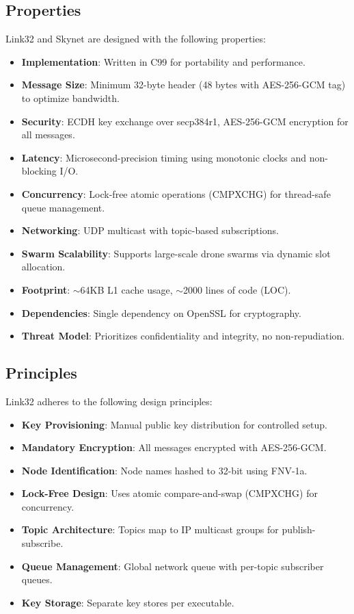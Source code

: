 \documentclass{article}
\begin{document}
\subsection{Properties}
Link32 and Skynet are designed with the following properties:
\begin{itemize}
    \item \textbf{Implementation}: Written in C99 for portability and performance.
    \item \textbf{Message Size}: Minimum 32-byte header (48 bytes with AES-256-GCM tag) to optimize
          bandwidth.
    \item \textbf{Security}: ECDH key exchange over secp384r1, AES-256-GCM encryption for all
          messages.
    \item \textbf{Latency}: Microsecond-precision timing using monotonic clocks and non-blocking I/O.
    \item \textbf{Concurrency}: Lock-free atomic operations (CMPXCHG) for thread-safe queue
          management.
    \item \textbf{Networking}: UDP multicast with topic-based subscriptions.
    \item \textbf{Swarm Scalability}: Supports large-scale drone swarms via dynamic slot allocation.
    \item \textbf{Footprint}: $\sim$64KB L1 cache usage, $\sim$2000 lines of code (LOC).
    \item \textbf{Dependencies}: Single dependency on OpenSSL for cryptography.
    \item \textbf{Threat Model}: Prioritizes confidentiality and integrity, no non-repudiation.
\end{itemize}

\subsection{Principles}
Link32 adheres to the following design principles:
\begin{itemize}
    \item \textbf{Key Provisioning}: Manual public key distribution for controlled setup.
    \item \textbf{Mandatory Encryption}: All messages encrypted with AES-256-GCM.
    \item \textbf{Node Identification}: Node names hashed to 32-bit using FNV-1a.
    \item \textbf{Lock-Free Design}: Uses atomic compare-and-swap (CMPXCHG) for concurrency.
    \item \textbf{Topic Architecture}: Topics map to IP multicast groups for publish-subscribe.
    \item \textbf{Queue Management}: Global network queue with per-topic subscriber queues.
    \item \textbf{Key Storage}: Separate key stores per executable.
\end{itemize}
\end{document}
